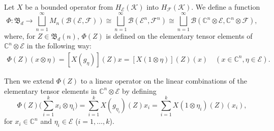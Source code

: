 \documentclass[12pt]{amsart}%
\numberwithin{equation}{section}
\newcommand{\fB}{{\mathfrak{B}}}
\newcommand{\clb}{\mathcal{B}}
\newcommand{\cle}{\mathcal{E}}
\newcommand{\clf}{\mathcal{F}}
\newcommand{\clk}{\mathcal{K}}
\newcommand{\C}{\mathbb{C}}
\begin{document}
Let $X$ be a bounded operator from $H_\cle(\clk)$ into $H_\clf(\clk)$. We define a function 
\[
\Phi:\fB_d\to \bigsqcup_{n=1}^\infty M_n(\clb(\cle, \clf))\cong \bigsqcup_{n=1}^\infty \clb(\cle^n, \clf^n) \cong \bigsqcup_{n=1}^\infty \clb(\C^n\otimes\cle, \C^n\otimes\clf),
\] 
where, for $Z\in \fB_d(n)$, $\Phi(Z)$ is defined on the elementary tensor elements of $\C^n\otimes\cle$ in the following way:
\begin{align}\label{mult_id}
\Phi(Z)(x\otimes \eta)= [X(g_\eta)](Z)x= [X(1\otimes \eta)](Z) (x) \quad (x\in\C^n, \eta\in\cle).
\end{align}

Then we extend $\Phi(Z)$ to a linear operator on the linear combinations of the elementary tensor elements in $\C^n\otimes \cle$ by defining
\[
\Phi(Z)\Big(\sum_{i=1}^k x_i\otimes \eta_i\Big)=\sum_{i=1}^k X(g_{\eta_i})(Z)x_i= \sum_{i=1}^k X(1\otimes \eta_i)(Z) (x_i),\]
for $x_i\in\C^n$ and $\eta_i\in\cle$ ($i=1,\ldots,k$).
\end{document}
